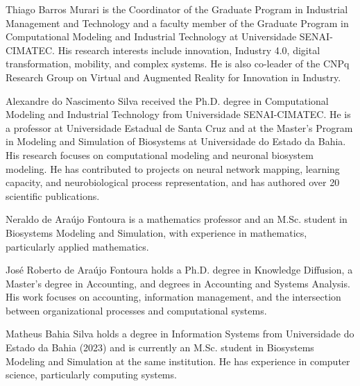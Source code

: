 \documentclass{IEEEoj}
\begin{document}
\begin{IEEEbiographynophoto}{Thiago Barros Murari}
is the Coordinator of the Graduate Program in Industrial Management and
Technology and a faculty member of the Graduate Program in Computational
Modeling and Industrial Technology at Universidade SENAI-CIMATEC. His
research interests include innovation, Industry 4.0, digital transformation,
mobility, and complex systems. He is also co-leader of the CNPq Research Group
on Virtual and Augmented Reality for Innovation in Industry.
\end{IEEEbiographynophoto}

\begin{IEEEbiographynophoto}{Alexandre do Nascimento Silva}
received the Ph.D. degree in Computational Modeling and Industrial Technology
from Universidade SENAI-CIMATEC. He is a professor at Universidade
Estadual de Santa Cruz and at the Master's Program in Modeling and Simulation
of Biosystems at Universidade do Estado da Bahia. His research focuses on
computational modeling and neuronal biosystem modeling. He has contributed to
projects on neural network mapping, learning capacity, and neurobiological
process representation, and has authored over 20 scientific publications.
\end{IEEEbiographynophoto}

\begin{IEEEbiographynophoto}{Neraldo de Ara\'{u}jo Fontoura}
is a mathematics professor and an M.Sc. student in Biosystems Modeling and Simulation, with experience in mathematics, particularly applied mathematics.
\end{IEEEbiographynophoto}

\begin{IEEEbiographynophoto}{Jos\'{e} Roberto de Ara\'{u}jo Fontoura}
holds a Ph.D. degree in Knowledge Diffusion, a Master's degree in Accounting,
and degrees in Accounting and Systems Analysis. His work focuses on
accounting, information management, and the intersection between
organizational processes and computational systems.
\end{IEEEbiographynophoto}

\begin{IEEEbiographynophoto}{Matheus Bahia Silva}
holds a degree in Information Systems from Universidade do Estado da Bahia (2023) and is currently an M.Sc. student in Biosystems Modeling and Simulation at the same institution. He has experience in computer science, particularly computing systems.
\end{IEEEbiographynophoto}
\end{document}

